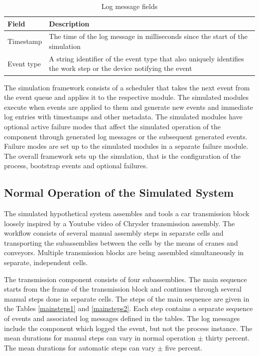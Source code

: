 \documentclass[journal]{IEEEtran}
\begin{document}
\begin{table}[!t]
\renewcommand{\arraystretch}{1.3}
\caption{Log message fields}
\label{fields}
\centering
\begin{tabular}{|p{25mm}|p{45mm}|}
\hline
Field & Description \\
\hline
\hline
Timestamp & The time of the log message in milliseconds since the start of the simulation \\
\hline
Event type & A string identifier of the event type that also uniquely identifies the work step or the device notifying the event \\
\hline
\end{tabular}
\end{table}

The simulation framework consists of a scheduler that takes the next event from the event queue and applies it to the respective module. The simulated modules
execute when events are applied to them and generate new events and immediate log entries with timestamps and other metadata.
The simulated modules have optional active failure modes that affect the simulated operation of the component through
generated log messages or the subsequent generated events. Failure modes are set up to the simulated modules in a separate failure module.
The overall framework sets up the simulation, that is the configuration of the process, bootstrap events and optional failures.

\subsection{Normal Operation of the Simulated System}
The simulated hypothetical system assembles and tools a car transmission block loosely inspired by a Youtube video of Chrysler transmission assembly\cite{transmission}.
The workflow consists of several manual assembly steps in separate cells and transporting the subassemblies between the cells by the means of
cranes and conveyors. Multiple transmission blocks are being assembled simultaneously in separate, independent cells.

The transmission component consists of four subassemblies. The main sequence starts from the frame of the transmission block
and continues through several manual steps done in separate cells. The steps of the main sequence are given in
the Tables \ref{mainsteps1} and \ref{mainsteps2}.
Each step contains a separate sequence of events and associated log messages defined in the tables. The log messages include the component which logged the event, but
not the process instance.
The mean durations for manual steps can vary in normal operation $\pm$ thirty percent. The mean durations for automatic steps can vary
$\pm$ five percent.
\end{document}
